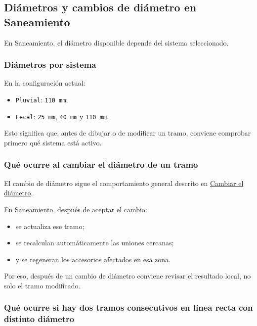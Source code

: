 \subsection{Diámetros y cambios de diámetro en Saneamiento}

En Saneamiento, el diámetro disponible depende del sistema seleccionado.

\subsubsection{Diámetros por sistema}

En la configuración actual:

\begin{itemize}
\item \texttt{Pluvial}: \texttt{110 mm};
\item \texttt{Fecal}: \texttt{25 mm}, \texttt{40 mm} y \texttt{110 mm}.
\end{itemize}

Esto significa que, antes de dibujar o de modificar un tramo, conviene comprobar primero qué sistema está activo.


\subsubsection{Qué ocurre al cambiar el diámetro de un tramo}

El cambio de diámetro sigue el comportamiento general descrito en \hyperref[sec:cambiar-diametro]{Cambiar el diámetro}.

En Saneamiento, después de aceptar el cambio:

\begin{itemize}
\item se actualiza ese tramo;
\item se recalculan automáticamente las uniones cercanas;
\item y se regeneran los accesorios afectados en esa zona.
\end{itemize}

Por eso, después de un cambio de diámetro conviene revisar el resultado local, no solo el tramo modificado.


\subsubsection{Qué ocurre si hay dos tramos consecutivos en línea recta con distinto diámetro}

